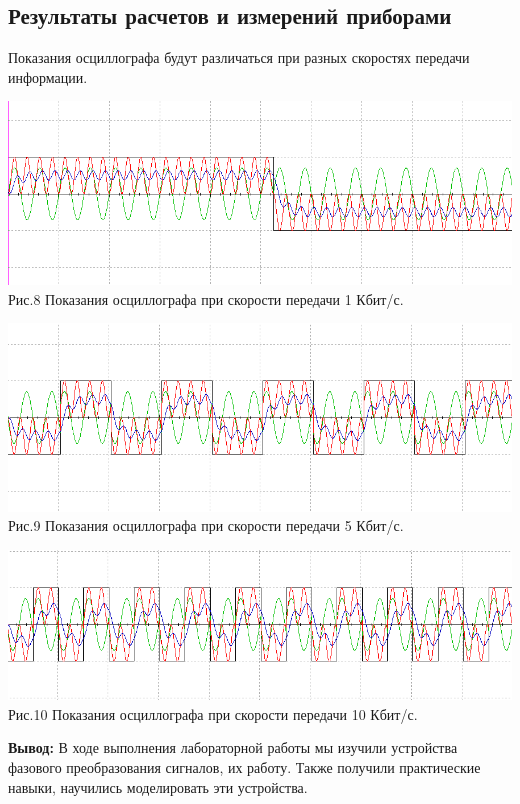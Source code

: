 \documentclass[11pt]{article}
\begin{document}
\subsection{Результаты расчетов и измерений приборами}
Показания осциллографа будут различаться при разных скоростях передачи информации.
\begin{center}
    \includegraphics[width=1\linewidth]{img/osc31.png}
        Рис.8 Показания осциллографа при скорости передачи 1 Кбит/с.
\end{center}

\begin{center}
    \includegraphics[width=1\linewidth]{img/osc32.png}
        Рис.9 Показания осциллографа при скорости передачи 5 Кбит/с.
\end{center}
\begin{center}
    \includegraphics[width=1\linewidth]{img/osc33.png}
        Рис.10 Показания осциллографа при скорости передачи 10 Кбит/с.
\end{center}


\textbf{Вывод:} В ходе выполнения лабораторной работы мы изучили устройства фазового преобразования сигналов, их работу. Также получили практические навыки, научились моделировать эти устройства.
\end{document}
